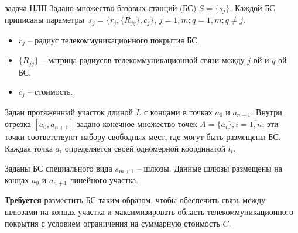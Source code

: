 
\begin{frame}
    {задача ЦЛП}
    \justifying
    Задано множество базовых станций (БС) $S = \{s_j\}$. Каждой БС приписаны параметры $s_j = \{r_j, \{R_{jq}\}, c_j \}$, $j = \overline{1,m}; q = \overline{1,m}; q \neq j$. 
    \begin{itemize}
        \item $r_j$ -- радиус телекоммуникационного покрытия БС,
        \item $\{R_{jq} \}$ -- матрица радиусов телекоммуникационной связи между $j$-ой и $q$-ой БС.
        \item $c_j$ -- стоимость.
    \end{itemize} 
    

    Задан протяженный участок длиной $L$ с концами в точках $a_0$ и $a_{n+1}$. Внутри  отрезка $[a_0, a_{n+1}]$ задано конечное множество точек $A=\{a_i\}, i=\overline{1,n}$; эти точки соответствуют набору свободных мест, где могут быть размещены БС. Каждая точка $a_i$ определяется своей одномерной координатой $l_i$. 
    
    \medskip
    
    Заданы БС специального вида $s_{m+1}$ -- шлюзы. Данные шлюзы размещены на концах $a_0$ и $a_{n+1}$ линейного участка. 
    \bigskip

    \textbf{Требуется} разместить  БС таким образом, чтобы обеспечить связь между шлюзами на концах участка и максимизировать область телекоммуникационного покрытия с условием ограничения на суммарную стоимость $C$.

\end{frame}



